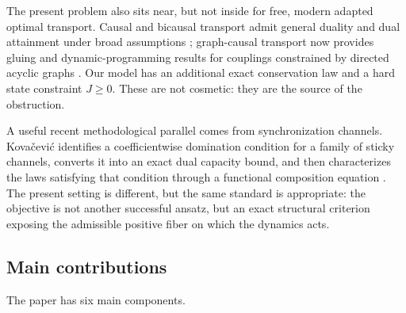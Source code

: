 \documentclass[11pt,a4paper]{article}
\theoremstyle{definition}
\theoremstyle{remark}
\begin{document}
The present problem also sits near, but not inside for free, modern adapted
optimal transport.  Causal and bicausal transport admit general duality and
dual attainment under broad assumptions \cite{KrsekPammer2025}; graph-causal
transport now provides gluing and dynamic-programming results for couplings
constrained by directed acyclic graphs \cite{OblojTuchilus2026}.  Our model has
an additional exact conservation law and a hard state constraint
\(J\ge0\).  These are not cosmetic: they are the source of the obstruction.

A useful recent methodological parallel comes from synchronization channels.
Kova\v{c}evi\'c identifies a coefficientwise domination condition for a family
of sticky channels, converts it into an exact dual capacity bound, and then
characterizes the laws satisfying that condition through a functional
composition equation \cite{Kovacevic2026}.  The present setting is different,
but the same standard is appropriate: the objective is not another successful
ansatz, but an exact structural criterion exposing the admissible positive
fiber on which the dynamics acts.

\subsection{Main contributions}

The paper has six main components.
\end{document}
